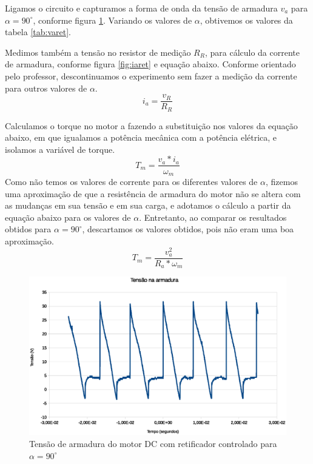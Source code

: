 \documentclass{article}
\begin{document}
Ligamos o circuito e capturamos a forma de onda da tensão de armadura $v_a$ para $\alpha=90^\circ$, conforme figura \ref{fig:varet}. Variando os valores de $\alpha$, obtivemos os valores da tabela \ref{tab:varet}.

Medimos também a tensão no resistor de medição $R_R$, para cálculo da corrente de armadura, conforme figura \ref{fig:iaret} e equação abaixo. Conforme orientado pelo professor, descontinuamos o experimento sem fazer a medição da corrente para outros valores de $\alpha$. 
\begin{equation}
i_a=\frac{v_R}{R_R}
\end{equation}

Calculamos o torque no motor a fazendo a substituição nos valores da equação abaixo, em que igualamos a potência mecânica com a potência elétrica, e isolamos a variável de torque.
\begin{equation}
T_m=\frac{v_a*i_a}{\omega_m}
\end{equation}
Como não temos os valores de corrente para os diferentes valores de $\alpha$, fizemos uma aproximação de que a resistência de armadura do motor não se altera com as mudanças em sua tensão e em sua carga, e adotamos o cálculo a partir da equação abaixo para os valores de $\alpha$. Entretanto, ao comparar os resultados obtidos para $\alpha=90^\circ$, descartamos os valores obtidos, pois não eram uma boa aproximação.
\begin{equation}
T_m=\frac{v_a^2}{R_a*\omega_m}
\end{equation}

\begin{figure}[H]
	\centering
	\includegraphics[width=\linewidth]{Dados/Retificador/1}
	\caption{Tensão de armadura do motor DC com retificador controlado para $\alpha=90^\circ$}
	\label{fig:varet}
\end{figure}
\end{document}
